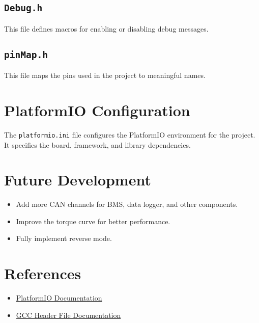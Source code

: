 \documentclass[a4paper,12pt]{article}
\begin{document}


\subsection{\texttt{Debug.h}}
This file defines macros for enabling or disabling debug messages.



\subsection{\texttt{pinMap.h}}
This file maps the pins used in the project to meaningful names.



\section{PlatformIO Configuration}
The \texttt{platformio.ini} file configures the PlatformIO environment for the project. It specifies the board, framework, and library dependencies.



\section{Future Development}
\begin{itemize}
    \item Add more CAN channels for BMS, data logger, and other components.
    \item Improve the torque curve for better performance.
    \item Fully implement reverse mode.
\end{itemize}

\section{References}
\begin{itemize}
    \item \href{https://docs.platformio.org/en/latest/}{PlatformIO Documentation}
    \item \href{https://gcc.gnu.org/onlinedocs/cpp/Header-Files.html}{GCC Header File Documentation}
\end{itemize}
\end{document}
